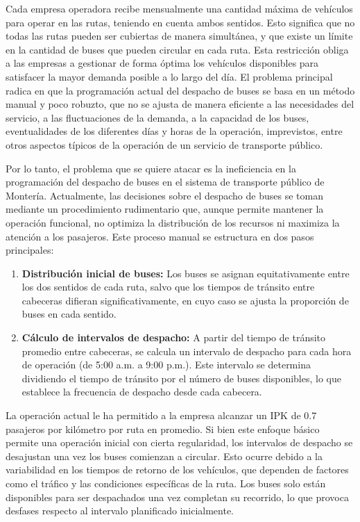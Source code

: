 \documentclass[preprint,11pt]{elsarticle}
\begin{document}
Cada empresa operadora recibe mensualmente una cantidad máxima de vehículos para operar en las rutas, teniendo en cuenta ambos sentidos. Esto significa que no todas las rutas pueden ser cubiertas de manera simultánea, y que existe un límite en la cantidad de buses que pueden circular en cada ruta. Esta restricción obliga a las empresas a gestionar de forma óptima los vehículos disponibles para satisfacer la mayor demanda posible a lo largo del día. El problema principal radica en que la programación actual del despacho de buses se basa en un método manual y poco robuzto, que no se ajusta de manera eficiente a las necesidades del servicio, a las fluctuaciones de la demanda, a la capacidad de los buses, eventualidades de los diferentes días y horas de la operación, imprevistos, entre otros aspectos típicos de la operación de un servicio de transporte público.

Por lo tanto, el problema que se quiere atacar es la ineficiencia en la programación del despacho de buses en el sistema de transporte público de Montería. Actualmente, las decisiones sobre el despacho de buses se toman mediante un procedimiento rudimentario que, aunque permite mantener la operación funcional, no optimiza la distribución de los recursos ni maximiza la atención a los pasajeros. Este proceso manual se estructura en dos pasos principales:


\begin{enumerate}
    \item \textbf{Distribución inicial de buses:} Los buses se asignan equitativamente entre los dos sentidos de cada ruta, salvo que los tiempos de tránsito entre cabeceras difieran significativamente, en cuyo caso se ajusta la proporción de buses en cada sentido.
    \item \textbf{Cálculo de intervalos de despacho:} A partir del tiempo de tránsito promedio entre cabeceras, se calcula un intervalo de despacho para cada hora de operación (de 5:00 a.m. a 9:00 p.m.). Este intervalo se determina dividiendo el tiempo de tránsito por el número de buses disponibles, lo que establece la frecuencia de despacho desde cada cabecera.
\end{enumerate}

La operación actual le ha permitido a la empresa alcanzar un IPK de 0.7 pasajeros por kilómetro por ruta en promedio. Si bien este enfoque básico permite una operación inicial con cierta regularidad, los intervalos de despacho se desajustan una vez los buses comienzan a circular. Esto ocurre debido a la variabilidad en los tiempos de retorno de los vehículos, que dependen de factores como el tráfico y las condiciones específicas de la ruta. Los buses solo están disponibles para ser despachados una vez completan su recorrido, lo que provoca desfases respecto al intervalo planificado inicialmente.
\end{document}

